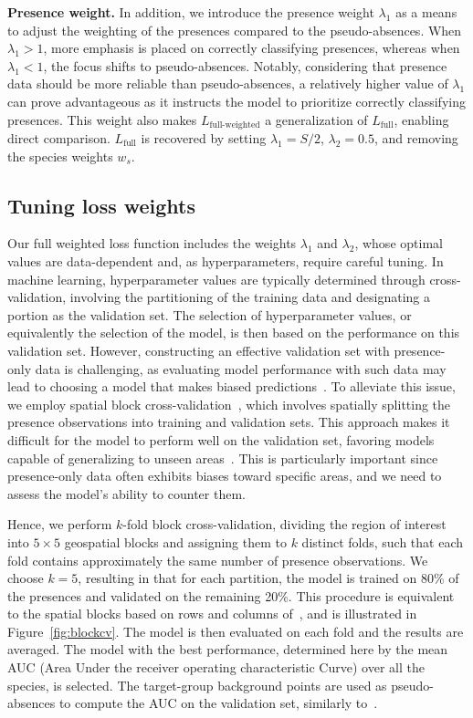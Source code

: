 \documentclass[3p,preprint,12pt]{elsarticle}
\begin{document}
\textbf{Presence weight.} 
In addition, we introduce the presence weight $\lambda_1$ as a means to adjust the weighting of the presences compared to the pseudo-absences. When $\lambda_1 > 1$, more emphasis is placed on correctly classifying presences, whereas when $\lambda_1 < 1$, the focus shifts to pseudo-absences. Notably, considering that presence data should be more reliable than pseudo-absences, a relatively higher value of $\lambda_1$ can prove advantageous as it instructs the model to prioritize correctly classifying presences. This weight also makes $L_{\text{full-weighted}}$ a generalization of $L_{\text{full}}$, enabling direct comparison. $L_{\text{full}}$ is recovered by setting $\lambda_1 = S/2$, $\lambda_2 = 0.5$, and removing the species weights $w_s$.

\subsection{Tuning loss weights}
\label{sec:cv}

Our full weighted loss function includes the weights $\lambda_1$ and $\lambda_2$, whose optimal values are data-dependent and, as hyperparameters, require careful tuning. In machine learning, hyperparameter values are typically determined through cross-validation, involving the partitioning of the training data and designating a portion as the validation set. The selection of hyperparameter values, or equivalently the selection of the model, is then based on the performance on this validation set. However, constructing an effective validation set with presence-only data is challenging, as evaluating model performance with such data may lead to choosing a model that makes biased predictions~\citep{el2018improved}.
To alleviate this issue, we employ spatial block cross-validation~\citep{roberts2017cross, valavi2023flexible}, which involves spatially splitting the presence observations into training and validation sets. This approach makes it difficult for the model to perform well on the validation set, favoring models capable of generalizing to unseen areas~\citep{smith2021validation}. This is particularly important since presence-only data often exhibits biases toward specific areas, and we need to assess the model's ability to counter them.

Hence, we perform $k$-fold block cross-validation, dividing the region of interest into $5 \times 5$ geospatial blocks and assigning them to $k$ distinct folds, such that each fold contains approximately the same number of presence observations. We choose $k=5$, resulting in that for each partition, the model is trained on 80\% of the presences and validated on the remaining 20\%. This procedure is equivalent to the spatial blocks based on rows and columns of~\cite{valavi2018blockcv}, and is illustrated in Figure~\ref{fig:blockcv}. The model is then evaluated on each fold and the results are averaged. The model with the best performance, determined here by the mean AUC (Area Under the receiver operating characteristic Curve) over all the species, is selected. The target-group background points are used as pseudo-absences to compute the AUC on the validation set, similarly to~\cite{valavi2023flexible}.
\end{document}
